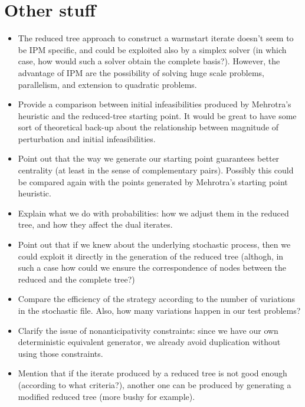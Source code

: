 %
%


%
%

%
%
\section{Other stuff}

\begin{itemize}
\item The reduced tree approach to construct a warmstart iterate 
doesn't seem to be IPM specific, and could be exploited also by a 
simplex solver (in which case, how would such a solver obtain the 
complete basis?). However, the advantage of IPM are the possibility 
of solving huge scale problems, parallelism, and extension to 
quadratic problems.

\item Provide a comparison between initial infeasibilities 
produced by Mehrotra's heuristic and the reduced-tree starting 
point. It would be great to have some sort of theoretical back-up 
about the relationship between magnitude of perturbation and 
initial infeasibilities.

\item Point out that the way we generate our starting point 
guarantees better centrality (at least in the sense of 
complementary pairs). Possibly this could be compared again 
with the points generated by Mehrotra's starting point heuristic.

\item Explain what we do with probabilities: how we adjust them 
in the reduced tree, and how they affect the dual iterates.

\item Point out that if we knew about the underlying 
stochastic process, then we could exploit it directly in the 
generation of the reduced tree (althogh, in such a case how 
could we ensure the correspondence of nodes between the reduced 
and the complete tree?)

\item Compare the efficiency of the strategy according to the 
number of variations in the stochastic file. Also, how many 
variations happen in our test problems?

\item Clarify the issue of nonanticipativity constraints: 
since we have our own deterministic equivalent generator, we 
already avoid duplication without using those constraints.


\item Mention that if the iterate produced by a reduced tree 
is not good enough (according to what criteria?), another one 
can be produced by generating a modified reduced tree (more 
bushy for example).
\end{itemize}


